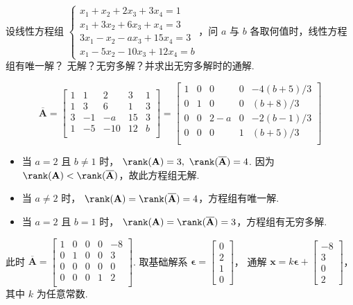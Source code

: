 \begin{problem}[本题10分]
  设线性方程组
  $\begin{cases}
    x_1 + x_2 + 2x_3 + 3x_4 = 1\\
    x_1 + 3x_2+ 6x_3 + x_4  = 3\\
    3x_1- x_2 - ax_3 + 15x_4= 3\\
    x_1 - 5x_2- 10x_3+ 12x_4= b
  \end{cases}$，问 $a$ 与 $b$ 各取何值时，线性方程组有唯一解？
  无解？无穷多解？并求出无穷多解时的通解.
\end{problem}
\scratch[18ex]
\begin{solution}
  \[
    \overline{\mathbf A} =
    \begin{bmatrix}
      1 & 1 & 2 & 3 & 1\\
      1 & 3 & 6 & 1 & 3\\
      3 &-1 &-a &15 & 3\\
      1 &-5 &-10&12 & b\\
    \end{bmatrix} =
    \begin{bmatrix}
      1 & 0 & 0 & 0 & -4(b+5)/3\\
      0 & 1 & 0 & 0 & (b+8)/3\\
      0 & 0 &2-a& 0 & -2(b-1)/3\\
      0 & 0 & 0 & 1 & (b+5)/3\\
    \end{bmatrix}
  \]
  \begin{itemize}
    \item 当 $a = 2$ 且 $ b\neq 1$ 时，
    $\rank(\mathbf A) = 3,~ \rank(\overline{\mathbf A}) = 4$.
    因为 $\rank(\mathbf A) < \rank(\overline{\mathbf A})$，故此方程组无解.
    \item 当 $a \neq 2$ 时，
    $\rank(\mathbf A) = \rank(\overline{\mathbf A}) = 4$，方程组有唯一解.
    \item 当 $a = 2$ 且 $b = 1$ 时，
    $\rank(\mathbf A) = \rank(\overline{\mathbf A}) = 3$，方程组有无穷多解.
  \end{itemize}

  此时 $\overline{\mathbf A}=
  \begin{bmatrix}
    1 & 0 & 0 & 0 &-8\\
    0 & 1 & 0 & 0 & 3\\
    0 & 0 & 0 & 0 & 0\\
    0 & 0 & 0 & 1 & 2\\
  \end{bmatrix}$. 取基础解系 $\bm\epsilon =
  \begin{bmatrix}
    0\\2\\1\\0
  \end{bmatrix}$，
  通解 $\bm x = k\bm\epsilon +
  \begin{bmatrix}
    -8\\3\\0\\2
  \end{bmatrix}$，其中 $k$ 为任意常数.
\end{solution}

